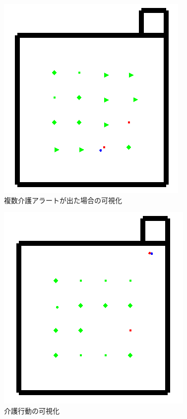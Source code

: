 \begin{figure}[htb]
\begin{center}
 \includegraphics[scale=0.5]{figures/alerts_v1.png}
 \caption[複数介護アラートが出た場合の可視化]{複数介護アラートが出た場合の可視化 \label{alerts_v1}}
\end{center}
\end{figure}

\begin{figure}[htb]
\begin{center}
 \includegraphics[scale=0.5]{figures/care_toilet_v1.png}
 \caption[介護行動の可視化]{介護行動の可視化 \label{care_toilet_v1}}
\end{center}
\end{figure}

